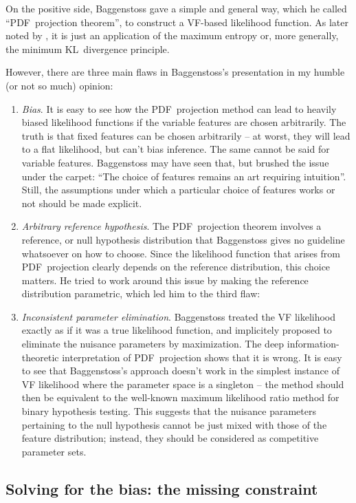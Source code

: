 \documentclass[english]{scrartcl}
\begin{document}
On the positive side, Baggenstoss gave a simple and general way, which he called ``PDF~projection theorem'', to construct a VF-based likelihood function. As later noted by \cite{Minka-04}, it is just an application of the maximum entropy or, more generally, the minimum KL~divergence principle.

However, there are three main flaws in Baggenstoss's presentation in my humble (or not so much) opinion:
\begin{enumerate}
\item {\em Bias}. It is easy to see how the PDF~projection method can lead to heavily biased likelihood functions if the variable features are chosen arbitrarily. The truth is that fixed features can be chosen arbitrarily -- at worst, they will lead to a flat likelihood, but can't bias inference. The same cannot be said for variable features. Baggenstoss may have seen that, but brushed the issue under the carpet: ``The choice of features remains an art requiring intuition''. Still, the assumptions under which a particular choice of features works or not should be made explicit.
\item {\em Arbitrary reference hypothesis}. The PDF~projection theorem involves a reference, or null hypothesis distribution that Baggenstoss gives no guideline whatsoever on how to choose. Since the likelihood function that arises from PDF~projection clearly depends on the reference distribution, this choice matters. He tried to work around this issue by making the reference distribution parametric, which led him to the third flaw:
\item {\em Inconsistent parameter elimination}. Baggenstoss treated the VF likelihood exactly as if it was a true likelihood function, and implicitely proposed to eliminate the nuisance parameters by maximization. The deep information-theoretic interpretation of PDF~projection shows that it is wrong. It is easy to see that Baggenstoss's approach doesn't work in the simplest instance of VF likelihood where the parameter space is a singleton -- the method should then be equivalent to the well-known maximum likelihood ratio method for binary hypothesis testing. This suggests that the nuisance parameters pertaining to the null hypothesis cannot be just mixed with those of the feature distribution; instead, they should be considered as competitive parameter sets.
\end{enumerate}


\subsection{Solving for the bias: the missing constraint}
\end{document}

